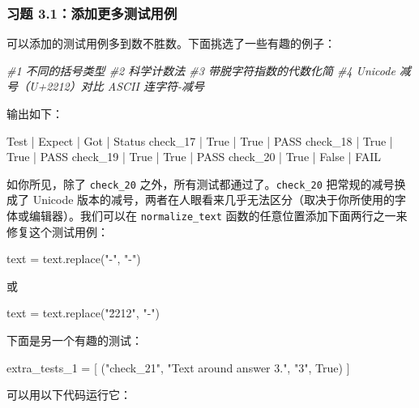 \subsubsection*{习题 3.1：添加更多测试用例}

可以添加的测试用例多到数不胜数。下面挑选了一些有趣的例子：

{\noindent\small\textit{\#1 不同的括号类型 \newline \#2 科学计数法 \newline \#3 带脱字符指数的代数化简 \newline \#4 Unicode 减号（U+2212）对比 ASCII 连字符-减号}\par}

输出如下：

\begin{codebox}
Test     | Expect | Got   | Status
check_17 | True   | True  | PASS
check_18 | True   | True  | PASS
check_19 | True   | True  | PASS
check_20 | True   | False | FAIL
\end{codebox}

如你所见，除了 \texttt{check\_20} 之外，所有测试都通过了。\texttt{check\_20} 把常规的减号换成了 Unicode 版本的减号，两者在人眼看来几乎无法区分（取决于你所使用的字体或编辑器）。我们可以在 \texttt{normalize\_text} 函数的任意位置添加下面两行之一来修复这个测试用例：

\begin{codebox}
text = text.replace("-", "-")
\end{codebox}

或

\begin{codebox}
text = text.replace("\u2212", "-")
\end{codebox}

下面是另一个有趣的测试：

\begin{codebox}
extra_tests_1 = [
    ("check_21", "Text around answer 3.", "3", True)
]
\end{codebox}

可以用以下代码运行它：


